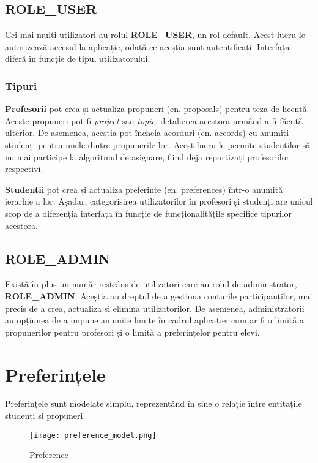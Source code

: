 \subsection{ROLE\_USER}

Cei mai mulți utilizatori au rolul \textbf{ROLE\_USER}, un rol default. Acest lucru le autorizează accesul la aplicație, odată ce aceștia sunt autentificați. Interfața diferă în funcție de tipul utilizatorului.

\subsubsection{Tipuri}

\textbf{Profesorii} pot crea și actualiza propuneri (en. proposals) pentru teza de licență. Aceste propuneri pot fi \textit{project} sau \textit{topic}, detalierea acestora urmând a fi făcută ulterior. De asemenea, aceștia pot încheia acorduri (en. accords) cu anumiți studenți pentru unele dintre propunerile lor. Acest lucru le permite studenților să nu mai participe la algoritmul de asignare, fiind deja repartizați profesorilor respectivi.

\textbf{Studenții} pot crea și actualiza preferințe (en. preferences) într-o anumită ierarhie a lor. Așadar, categorisirea utilizatorilor în profesori și studenți are unicul scop de a diferenția interfața în funcție de funcționalitățile specifice tipurilor acestora.


\subsection{ROLE\_ADMIN}

Există în plus un număr restrâns de utilizatori care au rolul de administrator, \textbf{ROLE\_ADMIN}. Aceștia au dreptul de a gestiona conturile participanților, mai precis de a crea, actualiza și elimina utilizatorilor. De asemenea, administratorii au opțiunea de a impune anumite limite în cadrul aplicației cum ar fi o limită a propunerilor pentru profesori și o limită a preferințelor pentru elevi.

\section{Preferințele}

Preferințele sunt modelate simplu, reprezentând în sine o relație între entitățile studenți și propuneri.

\begin{figure}[H]
	\centering
	\texttt{[image: preference\_model.png]}
	\caption{Preference}
\end{figure}

